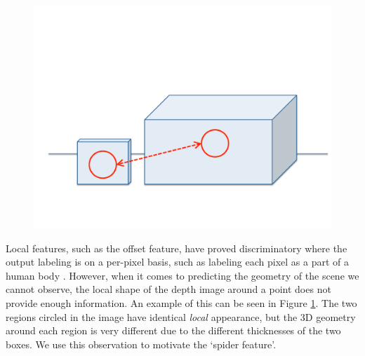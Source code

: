 \documentclass[10pt,twocolumn,letterpaper]{article}
\newcommand{\todo}[1]{\textcolor{red}{TODO: #1}}
\begin{document}
\begin{figure}
  \centering
  \vspace{-15pt}
    \includegraphics[width=0.45\columnwidth]{features_1}
    \vspace{-10pt}
  \caption{}%
    \label{fig:patch_problems}
\end{figure}
Local features, such as the offset feature, have proved discriminatory where the output labeling is on a per-pixel basis, such as labeling each pixel as a part of a human body \cite{shotton-cvpr-2011}.
However, when it comes to predicting the geometry of the scene we cannot observe, the local shape of the depth image around a point does not provide enough information.
An example of this can be seen in Figure \ref{fig:patch_problems}.
The two regions circled in the image have identical \emph{local} appearance, but the 3D geometry around each region is very different due to the different thicknesses of the two boxes.
We use this observation to motivate the `spider feature'.



\end{document}

